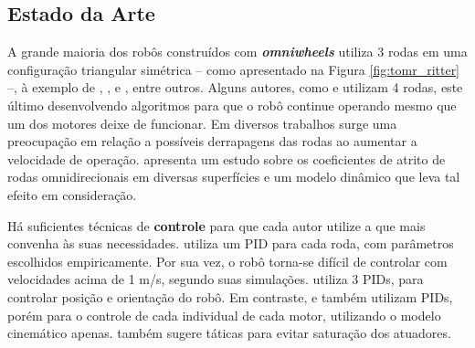 

\subsection{Estado da Arte}

A grande maioria dos robôs construídos com \textbf{\emph{omniwheels}} utiliza 3 rodas em uma configuração triangular simétrica -- como apresentado na Figura \ref{fig:tomr_ritter} --, à exemplo de \cite{ritter2016modelagem}, \cite{samani2007comprehensive}, \cite{williams2002dynamic} e \cite{indiveri2009swedish}, entre outros. Alguns autores, como \cite{krinkin2015design} e \cite{rojas2006holonomic} utilizam 4 rodas, este último desenvolvendo algoritmos para que o robô continue operando mesmo que um dos motores deixe de funcionar. Em diversos trabalhos surge uma preocupação em relação a possíveis derrapagens das rodas ao aumentar a velocidade de operação. \cite{williams2002dynamic} apresenta um estudo sobre os coeficientes de atrito de rodas omnidirecionais em diversas superfícies e um modelo dinâmico que leva tal efeito em consideração.

Há suficientes técnicas de \textbf{controle} para que cada autor utilize a que mais convenha às suas necessidades. \cite{ritter2016modelagem} utiliza um PID para cada roda, com parâmetros escolhidos empiricamente. Por sua vez, o robô torna-se difícil de controlar com velocidades acima de 1 m/s, segundo suas simulações. \cite{samani2007comprehensive} utiliza 3 PIDs, para controlar posição e orientação do robô. Em contraste, \cite{rojas2006holonomic} e \cite{indiveri2009swedish} também utilizam PIDs, porém para o controle de cada individual de cada motor, utilizando o modelo cinemático apenas. \cite{indiveri2009swedish} também sugere táticas para evitar saturação dos atuadores.


